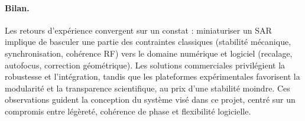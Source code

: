 \paragraph*{Bilan.}
Les retours d’expérience convergent sur un constat : miniaturiser un SAR implique de basculer une partie des contraintes classiques (stabilité mécanique, synchronisation, cohérence RF) vers le domaine numérique et logiciel (recalage, autofocus, correction géométrique).  
Les solutions commerciales privilégient la robustesse et l’intégration, tandis que les plateformes expérimentales favorisent la modularité et la transparence scientifique, au prix d’une stabilité moindre.  
Ces observations guident la conception du système visé dans ce projet, centré sur un compromis entre légèreté, cohérence de phase et flexibilité logicielle.
